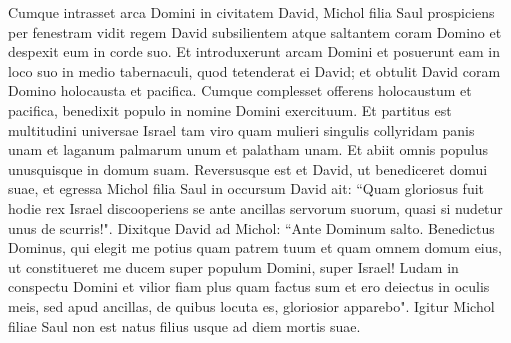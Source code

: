 \begin{biblechapter}
\verse Cumque intrasset arca Domini in civitatem David, Michol filia Saul prospiciens per fenestram vidit regem David subsilientem atque saltantem coram Domino et despexit eum in corde suo. 
\verse Et introduxerunt arcam Domini et posuerunt eam in loco suo in medio tabernaculi, quod tetenderat ei David; et obtulit David coram Domino holocausta et pacifica. 
\verse Cumque complesset offerens holocaustum et pacifica, benedixit populo in nomine Domini exercituum. 
\verse Et partitus est multitudini universae Israel tam viro quam mulieri singulis collyridam panis unam et laganum palmarum unum et palatham unam. Et abiit omnis populus unusquisque in domum suam. 
\verse Reversusque est et David, ut benediceret domui suae, et egressa Michol filia Saul in occursum David ait: “Quam gloriosus fuit hodie rex Israel discooperiens se ante ancillas servorum suorum, quasi si nudetur unus de scurris!". 
\verse Dixitque David ad Michol: “Ante Dominum salto. Benedictus Dominus, qui elegit me potius quam patrem tuum et quam omnem domum eius, ut constitueret me ducem super populum Domini, super Israel! 
\verse Ludam in conspectu Domini et vilior fiam plus quam factus sum et ero deiectus in oculis meis, sed apud ancillas, de quibus locuta es, gloriosior apparebo". 
\verse Igitur Michol filiae Saul non est natus filius usque ad diem mortis suae. 
\end{biblechapter}

